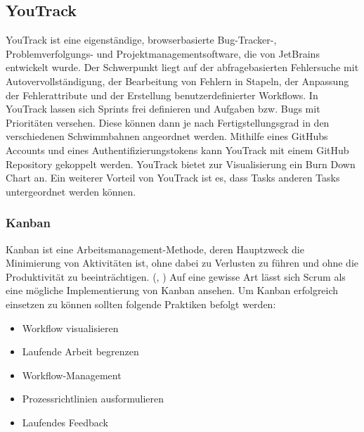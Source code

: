 \subsection{YouTrack}
\label{chap:youtrack}
YouTrack ist eine eigenständige, browserbasierte Bug-Tracker-, 
Problemverfolgungs- und Projektmanagementsoftware, die von JetBrains entwickelt wurde. 
Der Schwerpunkt liegt auf der abfragebasierten Fehlersuche mit Autovervollständigung, der 
Bearbeitung von Fehlern in Stapeln, der Anpassung der Fehlerattribute und der Erstellung 
benutzerdefinierter Workflows. 
\newline
In YouTrack lassen sich Sprints frei definieren und Aufgaben bzw. Bugs 
mit Prioritäten versehen. Diese können dann je nach Fertigstellungsgrad in den verschiedenen 
Schwimmbahnen angeordnet werden. Mithilfe eines GitHubs Accounts und eines Authentifizierungstokens 
kann YouTrack mit einem GitHub Repository gekoppelt werden.
YouTrack bietet zur Visualisierung ein Burn Down Chart an. Ein weiterer Vorteil von YouTrack ist es, dass
Tasks anderen Tasks untergeordnet werden können. \cite{noauthor_youtrack_nodate-1}

\subsubsection{Kanban}
Kanban ist eine Arbeitsmanagement-Methode, deren Hauptzweck die Minimierung von Aktivitäten ist, 
ohne dabei zu Verlusten zu führen und ohne die Produktivität zu beeinträchtigen. (\cite{noauthor_kanban_nodate}, \cite{noauthor_kanban_2022})
Auf eine gewisse Art lässt sich Scrum als eine mögliche Implementierung von Kanban ansehen.
Um Kanban erfolgreich einsetzen zu können sollten folgende Praktiken befolgt werden: \cite{noauthor_was_nodate-3}
\begin{itemize}
    \item Workflow visualisieren
    \item Laufende Arbeit begrenzen
    \item Workflow-Management
    \item Prozessrichtlinien ausformulieren
    \item Laufendes Feedback
\end{itemize}

